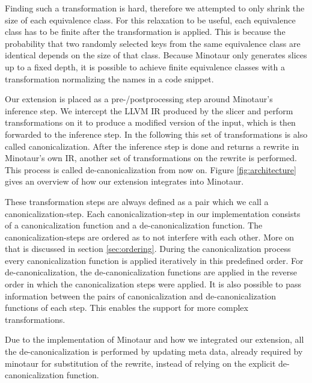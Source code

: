 	Finding such a transformation is hard, therefore we attempted to only shrink the size of each equivalence class. %
	For this relaxation to be useful, each equivalence class has to be finite after the transformation is applied.
	This is because the probability that two randomly selected keys from the same equivalence class are identical depends on the size of that class.
	Because Minotaur only generates slices up to a fixed depth, it is possible to achieve finite equivalence classes with a transformation normalizing the names in a code snippet.

	Our extension is placed as a pre-/postprocessing step around Minotaur's inference step.
	We intercept the LLVM IR produced by the slicer and perform transformations on it to produce a modified version of the input, which is then forwarded to the inference step.
	In the following this set of transformations is also called canonicalization.
	After the inference step is done and returns a rewrite in Minotaur's own IR, another set of transformations on the rewrite is performed.
	This process is called de-canonicalization from now on.
	Figure \ref{fig:architecture} gives an overview of how our extension integrates into Minotaur.	

	These transformation steps are always defined as a pair which we call a canonicalization-step.
	Each canonicalization-step in our implementation consists of a canonicalization function and a de-canonicalization function.
	The canonicalization-steps are ordered as to not interfere with each other.
	More on that is discussed in section \ref{sec:ordering}.
	During the canonicalization process every canonicalization function is applied iteratively in this predefined order.
	For de-canonicalization, the de-canonicalization functions are applied in the reverse order in which the canonicalization steps were applied.
	It is also possible to pass information between the pairs of canonicalization and de-canonicalization functions of each step.
	This enables the support for more complex transformations.

	Due to the implementation of Minotaur and how we integrated our extension, all the de-canonicalization is performed by updating meta data, already required by minotaur for substitution of the rewrite, instead of relying on the explicit de-canonicalization function.

